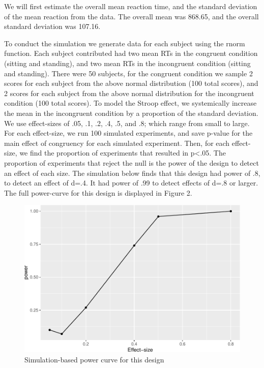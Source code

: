 \documentclass[man]{apa6}
\begin{document}
We will first estimate the overall mean reaction time, and the standard deviation of the mean reaction from the data. The overall mean was 868.65, and the overall standard deviation was 107.16.

To conduct the simulation we generate data for each subject using the rnorm function. Each subject contributed had two mean RTs in the congruent condition (sitting and standing), and two mean RTs in the incongruent condition (sitting and standing). There were 50 subjects, for the congruent condition we sample 2 scores for each subject from the above normal distribution (100 total scores), and 2 scores for each subject from the above normal distribution for the incongruent condition (100 total scores). To model the Stroop effect, we systemically increase the mean in the incongruent condition by a proportion of the standard deviation. We use effect-sizes of .05, .1, .2, .4, .5, and .8; which range from small to large. For each effect-size, we run 100 simulated experiments, and save p-value for the main effect of congruency for each simulated experiment. Then, for each effect-size, we find the proportion of experiments that resulted in p\textless{}.05. The proportion of experiments that reject the null is the power of the design to detect an effect of each size. The simulation below finds that this design had power of .8, to detect an effect of d=.4. It had power of .99 to detect effects of d=.8 or larger. The full power-curve for this design is displayed in Figure 2.

\begin{figure}
\centering
\includegraphics{APAreport_files/figure-latex/powerfig-1.pdf}
\caption{\label{fig:powerfig}Simulation-based power curve for this design}
\end{figure}
\end{document}
